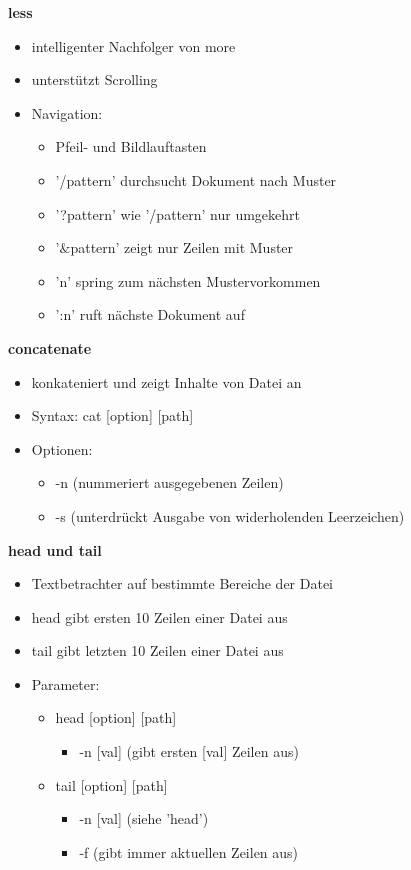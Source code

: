 \documentclass[12pt,utf8, 10pt]{article}
\begin{document}
\textbf{less}
\begin{itemize}
	\item intelligenter Nachfolger von more
	\item unterstützt Scrolling
	\item Navigation:
	\begin{itemize}
		\item Pfeil- und Bildlauftasten
		\item '/pattern' durchsucht Dokument nach Muster
		\item '?pattern' wie '/pattern' nur umgekehrt
		\item '$\&$pattern' zeigt nur Zeilen mit Muster
		\item 'n' spring zum nächsten Mustervorkommen
		\item ':n' ruft nächste Dokument auf
	\end{itemize}
\end{itemize}

\textbf{concatenate}
\begin{itemize}
	\item konkateniert und zeigt Inhalte von Datei an
	\item Syntax: cat [option] [path]
	\item Optionen:
	\begin{itemize}
		\item -n (nummeriert ausgegebenen Zeilen)
		\item -s (unterdrückt Ausgabe von widerholenden Leerzeichen)
	\end{itemize}
\end{itemize}

\textbf{head und tail}
\begin{itemize}
	\item Textbetrachter auf bestimmte Bereiche der Datei
	\item head gibt ersten 10 Zeilen einer Datei aus
	\item tail gibt letzten 10 Zeilen einer Datei aus
	\item Parameter:	
	\begin{itemize}
		\item head [option] [path]
		\begin{itemize}
			\item -n [val] (gibt ersten [val] Zeilen aus)
		\end{itemize}
		\item tail [option] [path]
		\begin{itemize}
			\item -n [val] (siehe 'head')
			\item -f (gibt immer aktuellen Zeilen aus)
		\end{itemize}
	\end{itemize}
\end{itemize}
\end{document}

